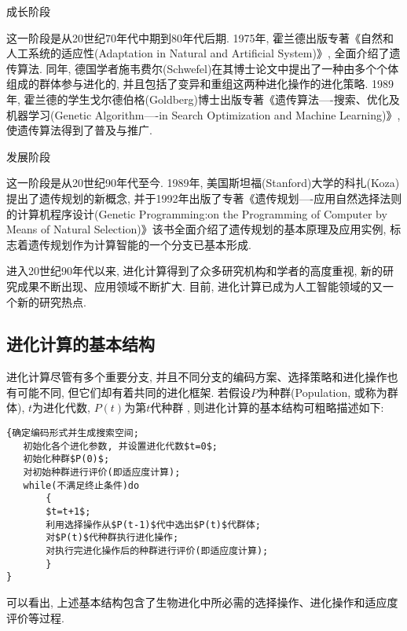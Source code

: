       成长阶段

     这一阶段是从20世纪70年代中期到80年代后期. 1975年, 霍兰德出版专著《自然和人工系统的适应性(Adaptation in Natural and Artificial System)》, 全面介绍了遗传算法. 同年, 德国学者施韦费尔(Schwefel)在其博士论文中提出了一种由多个个体组成的群体参与进化的, 并且包括了变异和重组这两种进化操作的进化策略. 1989年, 霍兰德的学生戈尔德伯格(Goldberg)博士出版专著《遗传算法----搜索、优化及机器学习(Genetic Algorithm----in Search Optimization and Machine Learning)》, 使遗传算法得到了普及与推广.

     发展阶段

     这一阶段是从20世纪90年代至今. 1989年, 美国斯坦福(Stanford)大学的科扎(Koza)提出了遗传规划的新概念, 并于1992年出版了专著《遗传规划----应用自然选择法则的计算机程序设计(Genetic Programming:on the Programming of Computer by Means of Natural Selection)》该书全面介绍了遗传规划的基本原理及应用实例, 标志着遗传规划作为计算智能的一个分支已基本形成.

    进入20世纪90年代以来, 进化计算得到了众多研究机构和学者的高度重视, 新的研究成果不断出现、应用领域不断扩大. 目前, 进化计算已成为人工智能领域的又一个新的研究热点.

\subsection{进化计算的基本结构}
进化计算尽管有多个重要分支, 并且不同分支的编码方案、选择策略和进化操作也有可能不同, 但它们却有着共同的进化框架. 若假设$P$为种群(Population, 或称为群体), $t$为进化代数,  $P(t)$为第$t$代种群 , 则进化计算的基本结构可粗略描述如下:
\begin{Verbatim}
{确定编码形式并生成搜索空间;
   初始化各个进化参数, 并设置进化代数$t=0$;
   初始化种群$P(0)$;
   对初始种群进行评价(即适应度计算);
   while(不满足终止条件)do
       {
       $t=t+1$;
       利用选择操作从$P(t-1)$代中选出$P(t)$代群体;
       对$P(t)$代种群执行进化操作;
       对执行完进化操作后的种群进行评价(即适应度计算);
       }
}
\end{Verbatim}

可以看出, 上述基本结构包含了生物进化中所必需的选择操作、进化操作和适应度评价等过程.


